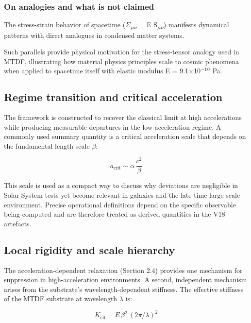 \documentclass[11pt,a4paper]{article}
\begin{document}
\begin{mdframed}[linecolor=accent,linewidth=0.5pt,backgroundcolor=callout-bg,leftline=true,rightline=true,topline=true,bottomline=true,innerleftmargin=8pt,innerrightmargin=8pt,innertopmargin=6pt,innerbottommargin=6pt]
\subsubsection{On analogies and what is not claimed}
The stress-strain behavior of spacetime ($\Sigma$\textsubscript{$\mu$$\nu$} = E S\textsubscript{$\mu$$\nu$}) manifests dynamical patterns with direct analogues in condensed matter systems.

Such parallels provide physical motivation for the stress-tensor analogy used in MTDF, illustrating how material physics principles scale to cosmic phenomena when applied to spacetime itself with elastic modulus E = 9.1$\times$10$^{-}$$^{1}$$^{0}$ Pa.
\end{mdframed}

\subsection{Regime transition and critical acceleration}
The framework is constructed to recover the classical limit at high accelerations while producing measurable departures in the low acceleration regime. A commonly used summary quantity is a critical acceleration scale that depends on the fundamental length scale \(\beta\):

\[
a_\mathrm{crit} \sim \alpha\,\frac{c^2}{\beta}
\]

This scale is used as a compact way to discuss why deviations are negligible in Solar System tests yet become relevant in galaxies and the late time large scale environment. Precise operational definitions depend on the specific observable being computed and are therefore treated as derived quantities in the V18 artefacts.

\subsection{Local rigidity and scale hierarchy}
The acceleration-dependent relaxation (Section 2.4) provides one mechanism for suppression in high-acceleration environments. A second, independent mechanism arises from the substrate's wavelength-dependent stiffness. The effective stiffness of the MTDF substrate at wavelength \(\lambda\) is:

\[
K_{\mathrm{eff}} = E\,\beta^2\,(2\pi/\lambda)^2
\]
\end{document}

